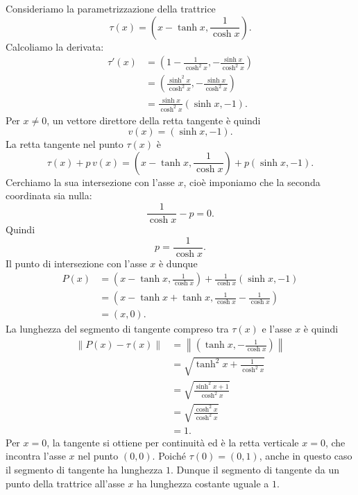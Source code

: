 \documentclass[a4paper]{article}
\begin{document}
\begin{snippetproof}{}
    Consideriamo la parametrizzazione della trattrice
    \[
        \tau(x)=
        \left(
            x-\tanh x,
            \frac{1}{\cosh x}
        \right).
    \]
    Calcoliamo la derivata:
    \begin{align*}
        \tau'(x)
        &=
        \left(
            1-\frac{1}{\cosh^2 x},
            -\frac{\sinh x}{\cosh^2 x}
        \right)\\
        &=
        \left(
            \frac{\sinh^2 x}{\cosh^2 x},
            -\frac{\sinh x}{\cosh^2 x}
        \right)\\
        &=
        \frac{\sinh x}{\cosh^2 x}
        \left(
            \sinh x,
            -1
        \right).
    \end{align*}
    Per \(x\neq0\), un vettore direttore della retta tangente è quindi
    \[
        v(x)=\left(\sinh x,-1\right).
    \]
    La retta tangente nel punto \(\tau(x)\) è
    \[
        \tau(x)+p\,v(x)
        =
        \left(
            x-\tanh x,
            \frac{1}{\cosh x}
        \right)
        +
        p\left(\sinh x,-1\right).
    \]
    Cerchiamo la sua intersezione con l'asse \(x\), cioè imponiamo che la seconda coordinata sia nulla:
    \[
        \frac{1}{\cosh x}-p=0.
    \]
    Quindi
    \[
        p=\frac{1}{\cosh x}.
    \]
    Il punto di intersezione con l'asse \(x\) è dunque
    \begin{align*}
        P(x)
        &=
        \left(
            x-\tanh x,
            \frac{1}{\cosh x}
        \right)
        +
        \frac{1}{\cosh x}
        \left(
            \sinh x,
            -1
        \right)\\
        &=
        \left(
            x-\tanh x+\tanh x,
            \frac{1}{\cosh x}-\frac{1}{\cosh x}
        \right)\\
        &=
        (x,0).
    \end{align*}
    La lunghezza del segmento di tangente compreso tra \(\tau(x)\) e l'asse \(x\) è quindi
    \begin{align*}
        \left\|P(x)-\tau(x)\right\|
        &=
        \left\|
        \left(
            \tanh x,
            -\frac{1}{\cosh x}
        \right)
        \right\|\\
        &=
        \sqrt{
            \tanh^2x+\frac{1}{\cosh^2x}
        }\\
        &=
        \sqrt{
            \frac{\sinh^2x+1}{\cosh^2x}
        }\\
        &=
        \sqrt{
            \frac{\cosh^2x}{\cosh^2x}
        }\\
        &=
        1.
    \end{align*}
    Per \(x=0\), la tangente si ottiene per continuità ed è la retta verticale \(x=0\), che incontra l'asse \(x\) nel punto \((0,0)\). Poiché \(\tau(0)=(0,1)\), anche in questo caso il segmento di tangente ha lunghezza \(1\).
    Dunque il segmento di tangente da un punto della trattrice all'asse \(x\) ha lunghezza costante uguale a \(1\).
\end{snippetproof}
\end{document}
